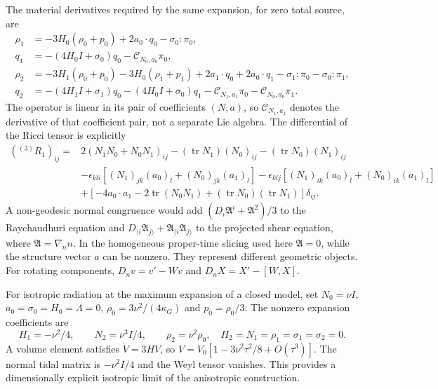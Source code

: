 The material derivatives required by the same expansion, for zero total source, are
\begin{align}
 \rho_1&=-3H_0(\rho_0+p_0)+2a_0\cdot q_0-\sigma_0:\pi_0,\nonumber\\
 q_1&=-(4H_0I+\sigma_0)q_0-\mathcal C_{N_0,a_0}\pi_0,\nonumber\\
 \rho_2&=-3H_1(\rho_0+p_0)-3H_0(\rho_1+p_1)
 +2a_1\cdot q_0+2a_0\cdot q_1-\sigma_1:\pi_0-\sigma_0:\pi_1,\nonumber\\
 q_2&=-(4H_1I+\sigma_1)q_0-(4H_0I+\sigma_0)q_1
 -\mathcal C_{N_1,a_1}\pi_0-\mathcal C_{N_0,a_0}\pi_1.
 \label{geo:material_second_derivatives}
\end{align}
The operator is linear in its pair of coefficients $(N,a)$, so $\mathcal C_{N_1,a_1}$ denotes the derivative of that coefficient pair, not a separate Lie algebra. The differential of the Ricci tensor is explicitly
\begin{align}
 ({}^{(3)}R_1)_{ij}={}&2(N_1N_0+N_0N_1)_{ij}
 -(\operatorname{tr}N_1)(N_0)_{ij}-(\operatorname{tr}N_0)(N_1)_{ij}\nonumber\\
 &-\epsilon_{kli}[(N_1)_{jk}(a_0)_l+(N_0)_{jk}(a_1)_l]
  -\epsilon_{klj}[(N_1)_{ik}(a_0)_l+(N_0)_{ik}(a_1)_l]\nonumber\\
 &+[-4a_0\cdot a_1-2\operatorname{tr}(N_0N_1)
       +(\operatorname{tr}N_0)(\operatorname{tr}N_1)]\delta_{ij}.
 \label{geo:ricci_differential}
\end{align}
A non-geodesic normal congruence would add
$(D_i\mathfrak A^i+\mathfrak A^2)/3$ to the Raychaudhuri equation and
$D_{\langle i}\mathfrak A_{j\rangle}+\mathfrak A_{\langle i}\mathfrak A_{j\rangle}$ to the projected shear equation, where $\mathfrak A=\nabla_nn$. In the homogeneous proper-time slicing used here $\mathfrak A=0$, while the structure vector $a$ can be nonzero. They represent different geometric objects. For rotating components, $D_nv=v'-Wv$ and $D_nX=X'-[W,X]$.

For isotropic radiation at the maximum expansion of a closed model, set
$N_0=\nu I$, $a_0=\sigma_0=H_0=\Lambda=0$,
$\rho_0=3\nu^2/(4\kappa_G)$ and $p_0=\rho_0/3$.
The nonzero expansion coefficients are
\begin{equation}
 H_1=-\nu^2/4,\qquad N_2=\nu^3I/4,\qquad
 \rho_2=\nu^2\rho_0,
 \quad H_2=N_1=\rho_1=\sigma_1=\sigma_2=0.
 \label{geo:FLRW_maximum}
\end{equation}
A volume element satisfies $\dot V=3HV$, so
$V=V_0[1-3\nu^2\tau^2/8+O(\tau^3)]$. The normal tidal matrix is $-\nu^2I/4$ and the Weyl tensor vanishes. This provides a dimensionally explicit isotropic limit of the anisotropic construction.

